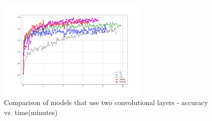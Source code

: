 \begin{figure}[htb!]
\centering\includegraphics[width=0.65\textwidth]{content/CL-CCL-CCLL-CMCML-CMCMLL.png}
\caption[Two convolutional layers]{\label{fig:twoconvs}Comparison of models that use two convolutional layers - accuracy vs. time(minutes)}
\end{figure}
